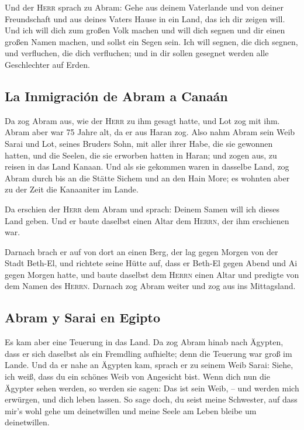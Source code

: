  Und der \textsc{Herr} sprach zu Abram: Gehe aus deinem
Vaterlande und von deiner Freundschaft und aus deines Vaters Hause in
ein Land, das ich dir zeigen will.  Und ich will dich zum
großen Volk machen und will dich segnen und dir einen großen Namen
machen, und sollst ein Segen sein.  Ich will segnen, die
dich segnen, und verfluchen, die dich verfluchen; und in dir sollen
gesegnet werden alle Geschlechter auf Erden.

\hypertarget{la-inmigraciuxf3n-de-abram-a-canauxe1n}{%
\subsection{La Inmigración de Abram a
Canaán}\label{la-inmigraciuxf3n-de-abram-a-canauxe1n}}

 Da zog Abram aus, wie der \textsc{Herr} zu ihm gesagt
hatte, und Lot zog mit ihm. Abram aber war 75 Jahre alt, da er aus Haran
zog.  Also nahm Abram sein Weib Sarai und Lot, seines
Bruders Sohn, mit aller ihrer Habe, die sie gewonnen hatten, und die
Seelen, die sie erworben hatten in Haran; und zogen aus, zu reisen in
das Land Kanaan. Und als sie gekommen waren in dasselbe Land,
 zog Abram durch bis an die Stätte Sichem und an den Hain
More; es wohnten aber zu der Zeit die Kanaaniter im Lande.

 Da erschien der \textsc{Herr} dem Abram und sprach:
Deinem Samen will ich dieses Land geben. Und er baute daselbst einen
Altar dem \textsc{Herrn}, der ihm erschienen war.

 Darnach brach er auf von dort an einen Berg, der lag
gegen Morgen von der Stadt Beth-El, und richtete seine Hütte auf, dass
er Beth-El gegen Abend und Ai gegen Morgen hatte, und baute daselbst dem
\textsc{Herrn} einen Altar und predigte von dem Namen des
\textsc{Herrn}.  Darnach zog Abram weiter und zog aus ins
Mittagsland.

\hypertarget{abram-y-sarai-en-egipto}{%
\subsection{Abram y Sarai en Egipto}\label{abram-y-sarai-en-egipto}}

 Es kam aber eine Teuerung in das Land. Da zog Abram
hinab nach Ägypten, dass er sich daselbst als ein Fremdling aufhielte;
denn die Teuerung war groß im Lande.  Und da er nahe an
Ägypten kam, sprach er zu seinem Weib Sarai: Siehe, ich weiß, dass du
ein schönes Weib von Angesicht bist.  Wenn dich nun die
Ägypter sehen werden, so werden sie sagen: Das ist sein Weib, -- und
werden mich erwürgen, und dich leben lassen.  So sage
doch, du seist meine Schwester, auf dass mir's wohl gehe um deinetwillen
und meine Seele am Leben bleibe um deinetwillen.

